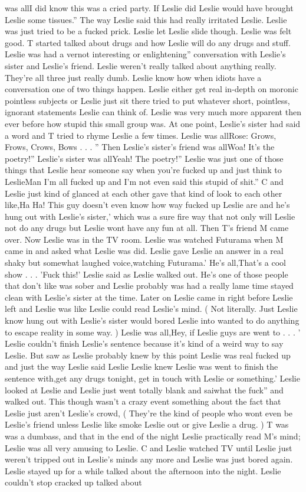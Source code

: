 \documentclass[12pt]{book}
\begin{document}
was allI did know this was a cried party. If Leslie did Leslie would have brought Leslie some tissues.'' The way Leslie said this had really irritated Leslie. Leslie was just tried to be a fucked prick. Leslie let Leslie slide though. Leslie was felt good. T started talked about drugs and how Leslie will do any drugs and stuff. Leslie was had a vernot interesting or enlightening'' conversation with Leslie's sister and Leslie's friend. Leslie weren't really talked about anything really. They're all three just really dumb. Leslie know how when idiots have a conversation one of two things happen. Leslie either get real in-depth on moronic pointless subjects or Leslie just sit there tried to put whatever short, pointless, ignorant statements Leslie can think of. Leslie was very much more apparent then ever before how stupid this small group was. At one point, Leslie's sister had said a word and T tried to rhyme Leslie a few times. Leslie was allRose: Grows, Frows, Crows, Bows . . . '' Then Leslie's sister's friend was allWoa! It's the poetry!'' Leslie's sister was allYeah! The poetry!'' Leslie was just one of those things that Leslie hear someone say when you're fucked up and just think to LeslieMan I'm all fucked up and I'm not even said this stupid of shit.'' C and Leslie just kind of glanced at each other gave that kind of look to each other like,Ha Ha! This guy doesn't even know how way fucked up Leslie are and he's hung out with Leslie's sister,' which was a sure fire way that not only will Leslie not do any drugs but Leslie wont have any fun at all. Then T's friend M came over. Now Leslie was in the TV room. Leslie was watched Futurama when M came in and asked what Leslie was did. Leslie gave Leslie an answer in a real shaky but somewhat laughed voice,watching Futurama.' He's all,That's a cool show . . .  'Fuck this!' Leslie said as Leslie walked out. He's one of those people that don't like was sober and Leslie probably was had a really lame time stayed clean with Leslie's sister at the time. Later on Leslie came in right before Leslie left and Leslie was like Leslie could read Leslie's mind. ( Not literally. Just Leslie know hung out with Leslie's sister would bored Leslie into wanted to do anything to escape reality in some way. ) Leslie was all,Hey, if Leslie guys are went to . . .  ' Leslie couldn't finish Leslie's sentence because it's kind of a weird way to say Leslie. But saw as Leslie probably knew by this point Leslie was real fucked up and just the way Leslie said Leslie Leslie knew Leslie was went to finish the sentence with,get any drugs tonight, get in touch with Leslie or something.' Leslie looked at Leslie and Leslie just went totally blank and saiwhat the fuck'' and walked out. This though wasn't a crazy event something about the fact that Leslie just aren't Leslie's crowd, ( They're the kind of people who wont even be Leslie's friend unless Leslie like smoke Leslie out or give Leslie a drug. ) T was was a dumbass, and that in the end of the night Leslie practically read M's mind; Leslie was all very amusing to Leslie. C and Leslie watched TV until Leslie just weren't tripped out in Leslie's minds any more and Leslie was just bored again. Leslie stayed up for a while talked about the afternoon into the night. Leslie couldn't stop cracked up talked about 
\end{document}
